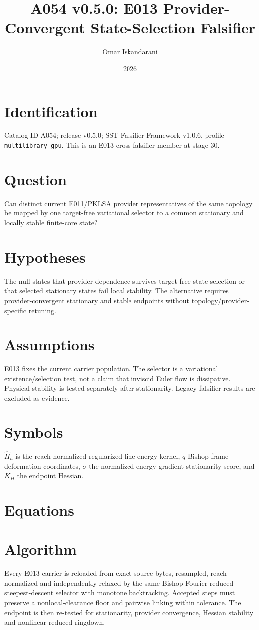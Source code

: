 \documentclass[11pt]{article}
\title{A054 v0.5.0: E013 Provider-Convergent State-Selection Falsifier}
\author{Omar Iskandarani}
\date{2026}
\begin{document}
\maketitle
\section{Identification}
Catalog ID A054; release v0.5.0; SST Falsifier Framework v1.0.6, profile \texttt{multilibrary\_gpu}. This is an E013 cross-falsifier member at stage 30.
\section{Question}
Can distinct current E011/PKLSA provider representatives of the same topology be mapped by one target-free variational selector to a common stationary and locally stable finite-core state?
\section{Hypotheses}
The null states that provider dependence survives target-free state selection or that selected stationary states fail local stability. The alternative requires provider-convergent stationary and stable endpoints without topology/provider-specific retuning.
\section{Assumptions}
E013 fixes the current carrier population. The selector is a variational existence/selection test, not a claim that inviscid Euler flow is dissipative. Physical stability is tested separately after stationarity. Legacy falsifier results are excluded as evidence.
\section{Symbols}
$\widehat H_a$ is the reach-normalized regularized line-energy kernel, $q$ Bishop-frame deformation coordinates, $\sigma$ the normalized energy-gradient stationarity score, and $K_H$ the endpoint Hessian.
\section{Equations}

\section{Algorithm}
Every E013 carrier is reloaded from exact source bytes, resampled, reach-normalized and independently relaxed by the same Bishop-Fourier reduced steepest-descent selector with monotone backtracking. Accepted steps must preserve a nonlocal-clearance floor and pairwise linking within tolerance. The endpoint is then re-tested for stationarity, provider convergence, Hessian stability and nonlinear reduced ringdown.
\end{document}

